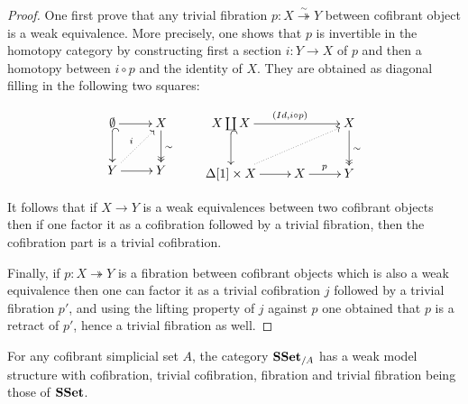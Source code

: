 \documentclass[reqno,10pt,a4paper,oneside,draft]{amsart}
\begin{document}
\begin{proof}
One first prove that any trivial fibration  $p:X \overset{\sim}{\twoheadrightarrow} Y$ between cofibrant object is a weak equivalence. More precisely, one shows that $p$ is invertible in the homotopy category by constructing first a section $i:Y \rightarrow X$ of $p$ and then a homotopy between $i \circ p$ and the identity of $X$. They are obtained as diagonal filling in the following two squares:

\[
\xymatrix{\emptyset \ar[r] \ar@{^{(}->}[d] & X \ar@{->>}[d]^{\sim} \\ Y \ar@{.>}[ur]^{i} \ar[r] & Y}
\qquad
\xymatrix{X \coprod X \ar[rr]^{(Id, i \circ p)} \ar@{^{(}->}[d] & &  X \ar@{->>}[d]^{\sim} \\ \Delta[1] \times X \ar@{.>}[rru] \ar[r]& X \ar[r]^{p} & Y  }
\]

It follows that if $X \rightarrow Y$ is a weak equivalences between two cofibrant objects then if one factor it as a cofibration followed by a trivial fibration, then the cofibration part is a trivial cofibration. 

Finally, if $p : X \twoheadrightarrow Y$ is a fibration between cofibrant objects which is also a weak equivalence then one can factor it as a trivial cofibration $j$ followed by a trivial fibration $p'$, and using the lifting property of $j$ against $p$ one obtained that $p$ is a retract of $p'$, hence a trivial fibration as well.


\end{proof}



\begin{corollary}
For any cofibrant simplicial set $A$, the category $\mathbf{SSet}_{/A}$ has a weak model structure with cofibration, trivial cofibration, fibration and trivial fibration being those of $\mathbf{SSet}$.
\end{corollary}
\end{document}
